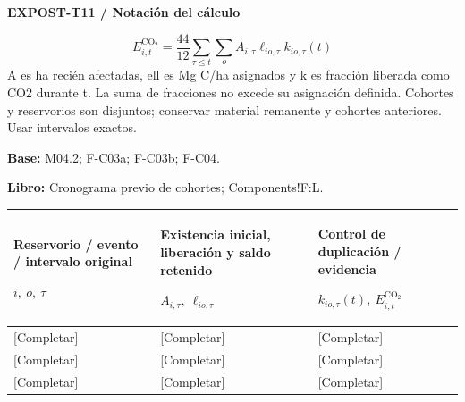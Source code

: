 \par\begingroup\sffamily\fontsize{8}{10}\selectfont\color{NEBGreen}\setlength{\parskip}{2pt}\setlength{\abovedisplayskip}{4pt}\setlength{\belowdisplayskip}{4pt}\setlength{\abovedisplayshortskip}{2pt}\setlength{\belowdisplayshortskip}{3pt}
\textbf{EXPOST-T11 / Notación del cálculo}\par
{\fontsize{9}{11}\selectfont\[ E^{\mathrm{CO_2}}_{i,t}=\frac{44}{12}\sum_{\tau\le t}\sum_o A_{i,\tau}\ell_{io,\tau}k_{io,\tau}(t) \]}
A es ha recién afectadas, ell es Mg C/ha asignados y k es fracción liberada como CO2 durante t. La suma de fracciones no excede su asignación definida. Cohortes y reservorios son disjuntos; conservar material remanente y cohortes anteriores. Usar intervalos exactos.\par
\textbf{Base:} M04.2; F-C03a; F-C03b; F-C04.\par
\textbf{Libro:} Cronograma previo de cohortes; Components!F:L.\par\endgroup
{\sffamily\fontsize{8.3}{10.3}\selectfont\begin{longtable}{@{}P{54.83mm} P{54.83mm} P{54.83mm}@{}}
\toprule
\textbf{Reservorio / evento / intervalo original}\par {\normalfont\fontsize{8.2}{10}\selectfont $i,\ o,\ \tau$} & \textbf{Existencia inicial, liberación y saldo retenido}\par {\normalfont\fontsize{8.2}{10}\selectfont $A_{i,\tau},\ \ell_{io,\tau}$} & \textbf{Control de duplicación / evidencia}\par {\normalfont\fontsize{8.2}{10}\selectfont $k_{io,\tau}(t),\ E^{\mathrm{CO_2}}_{i,t}$}\\\midrule\endhead
\rule{0pt}{8mm}[Completar] & [Completar] & [Completar]\\\hline
\rule{0pt}{8mm}[Completar] & [Completar] & [Completar]\\\hline
\rule{0pt}{8mm}[Completar] & [Completar] & [Completar]\\\hline
\end{longtable}}
